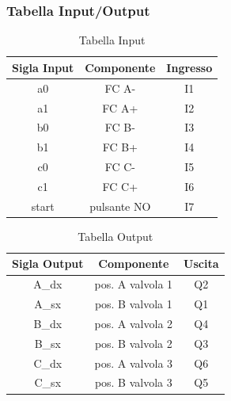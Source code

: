 \documentclass[12pt]{article}
\begin{document}
\subsubsection{Tabella Input/Output}
\begin{table}[H]
	\centering
	\begin{tabular}{|c|c|c|} \hline
		\rowcolor{Blue!80}  Sigla Input     & Componente  & Ingresso \\
		\hline
		\rowcolor{CornflowerBlue!50}  a0    & FC A-       & I1       \\
		\hline
		\rowcolor{RoyalBlue!50}    a1       & FC A+       & I2       \\
		\hline
		\rowcolor{CornflowerBlue!50}  b0    & FC B-       & I3       \\
		\hline
		\rowcolor{RoyalBlue!50}    b1       & FC B+       & I4       \\
		\hline
		\rowcolor{CornflowerBlue!50}  c0    & FC C-       & I5       \\
		\hline
		\rowcolor{RoyalBlue!50}    c1       & FC C+       & I6       \\
		\hline
		\rowcolor{CornflowerBlue!50}  start & pulsante NO & I7       \\
		\hline
	\end{tabular}
	\caption{Tabella Input}
\end{table}

\begin{table}[H]
	\centering
	\begin{tabular}{|c|c|c|} \hline
		\rowcolor{Blue!80}  Sigla Output    & Componente       & Uscita \\
		\hline
		\rowcolor{CornflowerBlue!50}  A\_dx & pos. A valvola 1 & Q2     \\
		\hline
		\rowcolor{RoyalBlue!50}    A\_sx    & pos. B valvola 1 & Q1     \\
		\hline
		\rowcolor{CornflowerBlue!50}  B\_dx & pos. A valvola 2 & Q4     \\
		\hline
		\rowcolor{RoyalBlue!50}    B\_sx    & pos. B valvola 2 & Q3     \\
		\hline
		\rowcolor{CornflowerBlue!50}  C\_dx & pos. A valvola 3 & Q6     \\
		\hline
		\rowcolor{RoyalBlue!50}    C\_sx    & pos. B valvola 3 & Q5     \\
		\hline
	\end{tabular}
	\caption{Tabella Output}
\end{table}
\newpage
\end{document}

